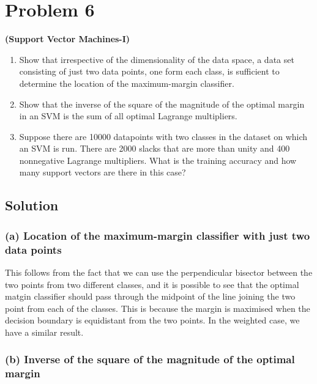 \section*{Problem 6}

\textbf{(Support Vector Machines-I)}
\begin{enumerate}[label= (\alph*), noitemsep, topsep=0pt]
    \item Show that irrespective of the dimensionality of the data space, a data set consisting of just two data points, one form each class, is sufficient to determine the location of the maximum-margin classifier.

    \item Show that the inverse of the square of the magnitude of the optimal margin in an SVM is the sum of all optimal Lagrange multipliers.

    \item Suppose there are 10000 datapoints with two classes in the dataset on which an SVM is run. There are 2000 slacks that are more than unity and 400 nonnegative Lagrange multipliers. What is the training accuracy and how many support vectors are there in this case?
\end{enumerate}

\subsection*{Solution}

\subsubsection*{(a) Location of the maximum-margin classifier with just two data points}

This follows from the fact that we can use the perpendicular bisector between the two points from two different classes, and it is possible to see that the optimal matgin classifier should pass through the midpoint of the line joining the two point from each of the classes.
This is because the margin is maximised when the decision boundary is equidistant from the two points.
In the weighted case, we have a similar result.

\subsubsection*{(b) Inverse of the square of the magnitude of the optimal margin}

